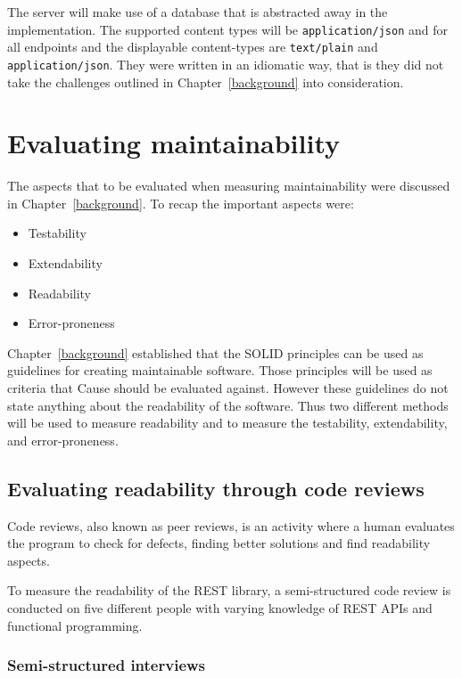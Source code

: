 The server will make use of a database that is abstracted away in the
implementation. The supported content types will be \texttt{application/json}
and for all endpoints and the displayable content-types are \texttt{text/plain}
and \texttt{application/json}.  They were written in an idiomatic way, that is
they did not take the challenges outlined in Chapter~\ref{background} into
consideration.

\section{Evaluating maintainability}\label{evaluatingmaintainability}

The aspects that to be evaluated when measuring maintainability were discussed
in Chapter~\ref{background}. To recap the important aspects were:

\begin{itemize}
    \item Testability
    \item Extendability
    \item Readability
    \item Error-proneness
\end{itemize}

Chapter~\ref{background} established that the SOLID principles can be used as
guidelines for creating maintainable software. Those principles will be used as
criteria that Cause should be evaluated against.  However these guidelines do
not state anything about the readability of the software.  Thus two different
methods will be used to measure readability and to measure the testability,
extendability, and error-proneness.

\subsection{Evaluating readability through code reviews}

Code reviews, also known as peer reviews, is an activity where a human evaluates
the program to check for defects, finding better solutions and find readability
aspects.~\cite{bosu2015characteristics}

To measure the readability of the REST library, a semi-structured code review is
conducted on five different people with varying knowledge of REST APIs and
functional programming.

\subsubsection{Semi-structured interviews}

